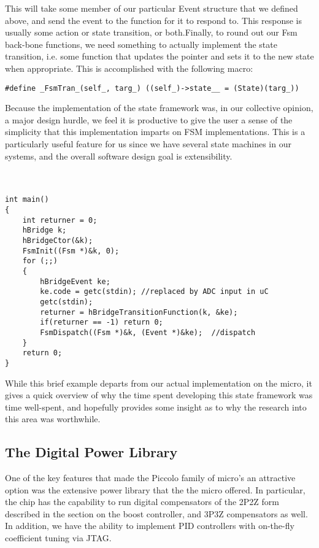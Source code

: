 This will take some member of our particular Event structure that we defined above, and send the event to the function for it to respond to. This response is usually some action or state transition, or both.Finally, to round out our Fsm back-bone functions, we need something to actually implement the state transition, i.e. some function that updates the pointer and sets it to the new state when appropriate. This is accomplished with the following macro:
\begin{lstlisting}
#define _FsmTran_(self_, targ_) ((self_)->state__ = (State)(targ_))
\end{lstlisting}
Because the implementation of the state framework was, in our collective opinion, a major design hurdle, we feel it is productive to give the user a sense of the simplicity that this implementation imparts on FSM implementations. This is a particularly useful feature for us since we have several state machines in our systems, and the overall software design goal is extensibility.  
\\
\\
\\
\begin{lstlisting}
int main()
{
    int returner = 0;
    hBridge k;
    hBridgeCtor(&k);
    FsmInit((Fsm *)&k, 0);
    for (;;)
    {
        hBridgeEvent ke;                   
        ke.code = getc(stdin); //replaced by ADC input in uC           
        getc(stdin);                      
        returner = hBridgeTransitionFunction(k, &ke);
        if(returner == -1) return 0;
        FsmDispatch((Fsm *)&k, (Event *)&ke);  //dispatch
    }
    return 0;
}
\end{lstlisting}
\hfill \break
\hfill \break
 
While this brief example departs from our actual implementation on the micro, it gives a quick overview of why the time spent developing this state framework was time well-spent, and hopefully provides some insight as to why the research into this area was worthwhile.

\subsection{The Digital Power Library}
One of the key features that made the Piccolo family of micro's an attractive option was the extensive power library that the the micro offered. In particular, the chip has the capability to run digital compensators of the 2P2Z form described in the section on the boost controller, and 3P3Z compensators as well. In addition, we have the ability to implement PID controllers with on-the-fly coefficient tuning via JTAG.


